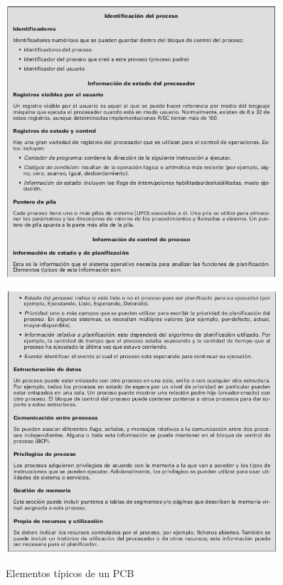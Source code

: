 \documentclass{article}
\begin{document}
				\begin{figure}
				\caption{Elementos típicos de un PCB}
				\label{figura2.10.12:PCB}
				\centering
				\includegraphics[width=0.9\textwidth, scale=1]{tema_2_figura10.png}
				\centering
				\includegraphics[width=0.9\textwidth, scale=1]{tema_2_figura11.png}
				\end{figure}
				
\end{document}
